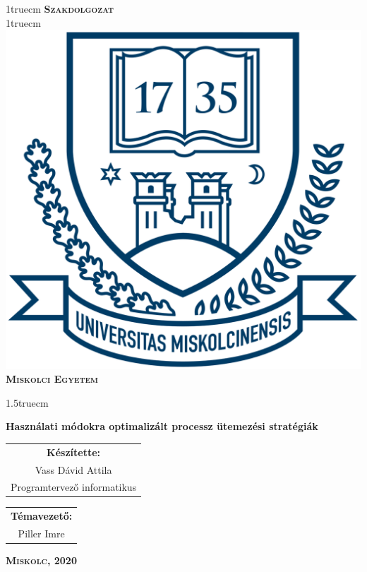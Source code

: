 \pagestyle{empty} %

{\large
\begin{center}
\vglue 1truecm
\textbf{\huge\textsc{Szakdolgozat}}\\
\vglue 1truecm
\includegraphics[width=4.8truecm, height=4truecm]{images/me_logo.png}\\
\textbf{\textsc{Miskolci Egyetem}}
\end{center}}

\vglue 1.5truecm %

{\LARGE
\begin{center}
\textbf{Használati módokra optimalizált processz ütemezési stratégiák
}
\end{center}}

\vspace*{2.5truecm}
{\large
\begin{center}
\begin{tabular}{c}
\textbf{Készítette:}\\
Vass Dávid Attila\\
Programtervező informatikus
\end{tabular}
\end{center}
\begin{center}
\begin{tabular}{c}
\textbf{Témavezető:}\\
Piller Imre
\end{tabular}
\end{center}}
\vfill
{\large
\begin{center}
\textbf{\textsc{Miskolc, 2020}}
\end{center}}

\newpage
